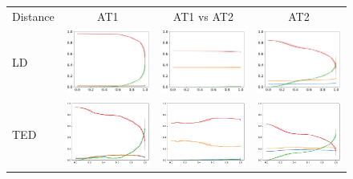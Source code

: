 \begin{figure}
\begin{tabular}{lccc}
    Distance & AT1                                                                         & AT1 vs AT2                                                                    & AT2                                                                         \\
    LD       & \includegraphics[width=.25\linewidth]{code/img/operation_count_ld_AT1.pdf}  & \includegraphics[width=.25\linewidth]{code/img/operation_count_ld_AT1-2.pdf}  & \includegraphics[width=.25\linewidth]{code/img/operation_count_ld_AT2.pdf}  \\
    TED      & \includegraphics[width=.25\linewidth]{code/img/operation_count_zss_AT1.pdf} & \includegraphics[width=.25\linewidth]{code/img/operation_count_zss_AT1-2.pdf} & \includegraphics[width=.25\linewidth]{code/img/operation_count_zss_AT2.pdf} \\

\end{tabular}
\end{figure}
